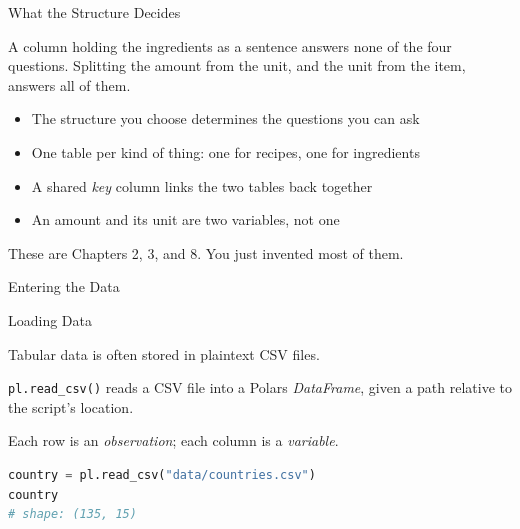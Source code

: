 \documentclass[8pt,aspectratio=169]{beamer}
\begin{document}
\begin{textframe}{What the Structure Decides}

A column holding the ingredients as a sentence answers none of the four
questions. Splitting the amount from the unit, and the unit from the item,
answers all of them.

\begin{itemize}
\item The structure you choose determines the questions you can ask
\item One table per kind of thing: one for recipes, one for ingredients
\item A shared \textit{key} column links the two tables back together
\item An amount and its unit are two variables, not one
\end{itemize}

These are Chapters 2, 3, and 8. You just invented most of them.

\end{textframe}

\begin{rightframe}{Entering the Data}
\end{rightframe}

\begin{frame}[fragile]{Loading Data}
\begin{splitcode}{%

Tabular data is often stored in plaintext CSV files.

\texttt{pl.read\_csv()} reads a CSV file into a Polars \textit{DataFrame}, given a path relative to the script's location.

Each row is an \textit{observation}; each column is a \textit{variable}.

}
\begin{lstlisting}[language=Python]
country = pl.read_csv("data/countries.csv")
country
# shape: (135, 15)
\end{lstlisting}
\end{splitcode}
\end{frame}
\end{document}
